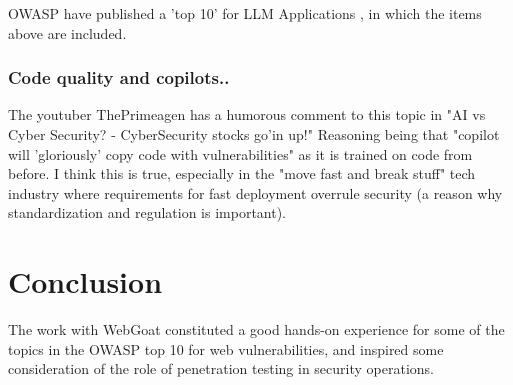 \documentclass[
	letterpaper, %
	10pt, %
	unnumberedsections, %
	twoside, %
]{APAAssignment}
\begin{document}
OWASP have published a 'top 10' for LLM Applications \cite{OWASP-Top10-LLM}, in which the items above are included.

\subsubsection{Code quality and copilots..} The youtuber ThePrimeagen has a humorous comment to this topic in \cite{ThePrimaegenCyberStocksUp} "AI vs Cyber Security? - CyberSecurity stocks go'in up!" Reasoning being that "copilot will 'gloriously' copy code with vulnerabilities" as it is trained on code from before. I think this is true, especially in the "move fast and break stuff" tech industry where requirements for fast deployment overrule security (a reason why standardization and regulation is important).    


\section{Conclusion}
The work with WebGoat constituted a good hands-on experience for some of the topics in the OWASP top 10 for web vulnerabilities, and inspired some consideration of the role of penetration testing in security operations.   


\clearpage
\printbibliography %





\appendix


\clearpage
\end{document}
